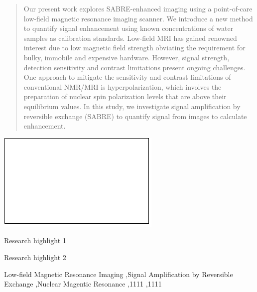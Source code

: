 \documentclass[final,3p,times,twocolumn]{elsarticle}
\begin{document}
\begin{frontmatter}
\author[inst3]{Matthew S. Rosen}

\author[inst4]{Eduard Y. Chekmenev}
\author[inst1]{Boyd M. Goodson}

\begin{abstract}
Our present work explores SABRE-enhanced imaging using a point-of-care low-field magnetic resonance imaging scanner. We introduce a new method to quantify signal enhancement using known concentrations of water samples as calibration standards. Low-field MRI has gained renowned interest due to low magnetic field strength obviating the requirement for bulky, immobile and expensive hardware. However, signal strength, detection sensitivity and contrast limitations present ongoing challenges. One approach to mitigate the sensitivity and contrast limitations of conventional NMR/MRI is hyperpolarization, which involves the preparation of nuclear spin polarization levels that are above their equilibrium values. 
In this study, we investigate signal amplification by reversible exchange (SABRE) to quantify signal from images to calculate enhancement. 
\end{abstract}

\begin{graphicalabstract}
\includegraphics{grabs}
\end{graphicalabstract}

\begin{highlights}
\item Research highlight 1
\item Research highlight 2
\end{highlights}

\begin{keyword}
Low-field Magnetic Resonance Imaging \sep Signal Amplification by Reversible Exchange \sep Nuclear Magentic Resonance 
 \sep 1111
 \sep 1111
\end{keyword}

\end{frontmatter}
\end{document}
